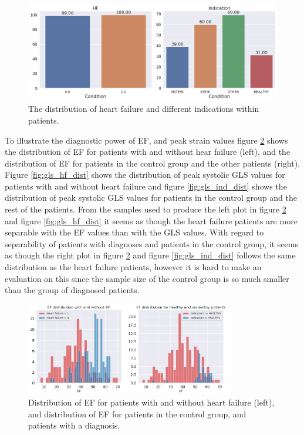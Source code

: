 \begin{figure}[h]
    \begin{center}
    \includegraphics[width=\textwidth]{data-exp/hf_indication_dist.png}
    \end{center}
    \caption{The distribution of heart failure and different indications within patients.}
    \label{fig:hf_ind_dist}
\end{figure}

To illustrate the diagnostic power of EF, and peak strain values figure \ref{fig:ef_hf_ind_dist} shows the distribution of EF for patients with and without hear failure (left), and the distribution of EF for patients in the control group and the other patients (right). Figure \ref{fig:gls_hf_dist} shows the distribution of peak systolic GLS values for patients with and without heart failure and figure \ref{fig:gls_ind_dist} shows the distribution of peak systolic GLS values for patients in the control group and the rest of the patients. From the samples used to produce the left plot in figure \ref{fig:ef_hf_ind_dist} and figure \ref{fig:gls_hf_dist} it seems as though the heart failure patients are more separable with the EF values than with the GLS values. With regard to separability of patients with diagnoses and patients in the control group, it seems as though the right plot in figure \ref{fig:ef_hf_ind_dist} and figure \ref{fig:gls_ind_dist} follows the same distribution as the heart failure patients, however it is hard to make an evaluation on this since the sample size of the control group is so much smaller than the group of diagnosed patients.

\begin{figure}[h]
    \begin{center}
    \includegraphics[width=0.8\textwidth]{data-exp/EF_HF_ind_dist.png}
    \end{center}
    \caption{Distribution of EF for patients with and without heart failure (left), and distribution of EF for patients in the control group, and patients with a diagnosis.}
    \label{fig:ef_hf_ind_dist}
\end{figure}

